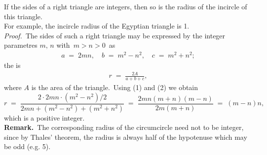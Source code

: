 \documentclass[12pt]{article}
\theoremstyle{definition}
\begin{document}
If the sides of a right triangle are integers, then so is the radius of the incircle of this triangle.\\
For example, the incircle radius of the Egyptian triangle is 1.\\

{\em Proof.}\, The sides of such a right triangle may be expressed by the integer parametres $m,\,n$ with\,
$m > n > 0$\, as 
\begin{align}
       a \;=\; 2mn, \quad b \;=\; m^2\!-\!n^2, \quad c \;=\; m^2\!+\!n^2;
\end{align}
the  is
\begin{align}
       r \;=\; \frac{2A}{a\!+\!b\!+\!c},
\end{align}
where $A$ is the area of the triangle.\, Using (1) and (2) we obtain
$$r \;=\; \frac{2\cdot2mn\cdot(m^2\!-\!n^2)/2}{2mn\!+\!(m^2\!-\!n^2)\!+\!(m^2\!+\!n^2)} \;=\; 
      \frac{2mn(m\!+\!n)(m\!-\!n)}{2m(m\!+\!n)} \;=\; (m\!-\!n)n,$$
which is a positive integer.\\


\textbf{Remark.}\, The corresponding radius of the circumcircle need not to be integer, since by Thales' theorem, the radius is always half of the hypotenuse which may be odd (e.g. 5).



\end{document}
